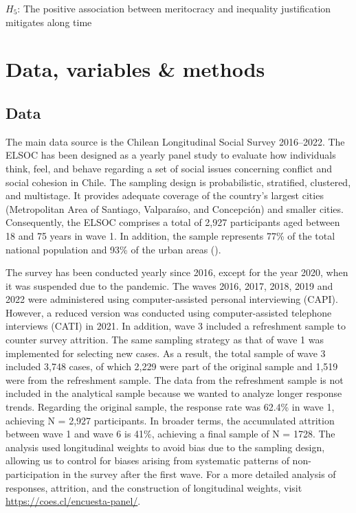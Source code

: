 \documentclass[
  12pt,
  a4paper,
]{article}
\begin{document}
\(H_5\): The positive association between meritocracy and inequality justification mitigates along time

\section{Data, variables \& methods}\label{data-variables-methods}

\subsection{Data}\label{data}

The main data source is the Chilean Longitudinal Social Survey 2016--2022. The ELSOC has been designed as a yearly panel study to evaluate how individuals think, feel, and behave regarding a set of social issues concerning conflict and social cohesion in Chile. The sampling design is probabilistic, stratified, clustered, and multistage. It provides adequate coverage of the country's largest cities (Metropolitan Area of Santiago, Valparaíso, and Concepción) and smaller cities. Consequently, the ELSOC comprises a total of 2,927 participants aged between 18 and 75 years in wave 1. In addition, the sample represents 77\% of the total national population and 93\% of the urban areas ().

The survey has been conducted yearly since 2016, except for the year 2020, when it was suspended due to the pandemic. The waves 2016, 2017, 2018, 2019 and 2022 were administered using computer-assisted personal interviewing (CAPI). However, a reduced version was conducted using computer-assisted telephone interviews (CATI) in 2021. In addition, wave 3 included a refreshment sample to counter survey attrition. The same sampling strategy as that of wave 1 was implemented for selecting new cases. As a result, the total sample of wave 3 included 3,748 cases, of which 2,229 were part of the original sample and 1,519 were from the refreshment sample. The data from the refreshment sample is not included in the analytical sample because we wanted to analyze longer response trends. Regarding the original sample, the response rate was 62.4\% in wave 1, achieving N = 2,927 participants. In broader terms, the accumulated attrition between wave 1 and wave 6 is 41\%, achieving a final sample of N = 1728. The analysis used longitudinal weights to avoid bias due to the sampling design, allowing us to control for biases arising from systematic patterns of non-participation in the survey after the first wave. For a more detailed analysis of responses, attrition, and the construction of longitudinal weights, visit \url{https://coes.cl/encuesta-panel/}.
\end{document}
